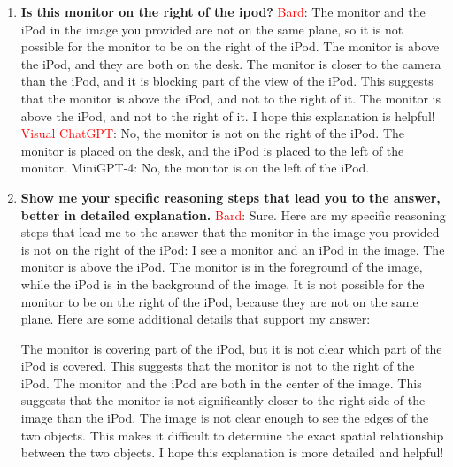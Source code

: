 \begin{enumerate}
    Do you have other questions or requests?
    \subitem \textcolor{red}{Visual ChatGPT}: The monitor is placed on the desk, and the iPod is placed to the left of the monitor.
    \subitem MiniGPT-4: The monitor and the iPod are on a desk, with the monitor in front of the iPod. The monitor is a computer device that displays images and text on a screen, while the iPod is a portable media player that can store and play music and other media files.
    \item \textbf{Is this monitor on the right of the ipod?}
    \subitem \textcolor{Red}{Bard}: The monitor and the iPod in the image you provided are not on the same plane, so it is not possible for the monitor to be on the right of the iPod. The monitor is above the iPod, and they are both on the desk. The monitor is closer to the camera than the iPod, and it is blocking part of the view of the iPod. This suggests that the monitor is above the iPod, and not to the right of it. The monitor is above the iPod, and not to the right of it.
    I hope this explanation is helpful!
    \subitem \textcolor{red}{Visual ChatGPT}: No, the monitor is not on the right of the iPod. The monitor is placed on the desk, and the iPod is placed to the left of the monitor.
    \subitem MiniGPT-4: No, the monitor is on the left of the iPod.
    \item \textbf{Show me your specific reasoning steps that lead you to the answer, better in detailed explanation.}
    \subitem \textcolor{Red}{Bard}: 
    Sure. Here are my specific reasoning steps that lead me to the answer that the monitor in the image you provided is not on the right of the iPod:
    I see a monitor and an iPod in the image.
    The monitor is above the iPod.
    The monitor is in the foreground of the image, while the iPod is in the background of the image.
    It is not possible for the monitor to be on the right of the iPod, because they are not on the same plane.
    Here are some additional details that support my answer:

    The monitor is covering part of the iPod, but it is not clear which part of the iPod is covered. This suggests that the monitor is not to the right of the iPod.
    The monitor and the iPod are both in the center of the image. This suggests that the monitor is not significantly closer to the right side of the image than the iPod.
    The image is not clear enough to see the edges of the two objects. This makes it difficult to determine the exact spatial relationship between the two objects.
    I hope this explanation is more detailed and helpful!


\end{enumerate}
